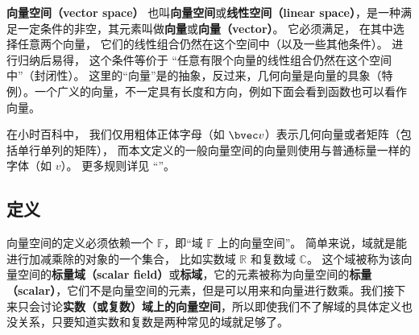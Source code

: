 
\begin{issues}
\issueTODO
\end{issues}


\textbf{向量空间（vector space）} 也叫\textbf{向量空间}或\textbf{线性空间（linear space）}，是一种满足一定条件的非空，其元素叫做\textbf{向量}或\textbf{向量（vector）}。 它必须满足， 在其中选择任意两个向量， 它们的线性组合仍然在这个空间中（以及一些其他条件）。 进行归纳后易得， 这个条件等价于 “任意有限个向量的线性组合仍然在这个空间中”（封闭性）。 这里的“向量”是的抽象，反过来，几何向量是向量的具象（特例）。一个广义的向量，不一定具有长度和方向，例如下面会看到函数也可以看作向量。

在小时百科中， 我们仅用粗体正体字母（如 $\bvec v$）表示几何向量或者矩阵（包括单行单列的矩阵）， 而本文定义的一般向量空间的向量则使用与普通标量一样的字体（如 $v$）。 更多规则详见 “”。

\subsection{定义}
向量空间的定义必须依赖一个 $\mathbb F$，即“域 $\mathbb{F}$ 上的向量空间”。 简单来说，域就是能进行加减乘除的对象的一个集合， 比如实数域 $\mathbb R$ 和复数域 $\mathbb C$。 这个域被称为该向量空间的\textbf{标量域（scalar field）}或\textbf{标域}，它的元素被称为向量空间的\textbf{标量（scalar）}，它们不是向量空间的元素，但是可以用来和向量进行数乘。我们接下来只会讨论\textbf{实数（或复数）域上的向量空间}，所以即使我们不了解域的具体定义也没关系，只要知道实数和复数是两种常见的域就足够了。

